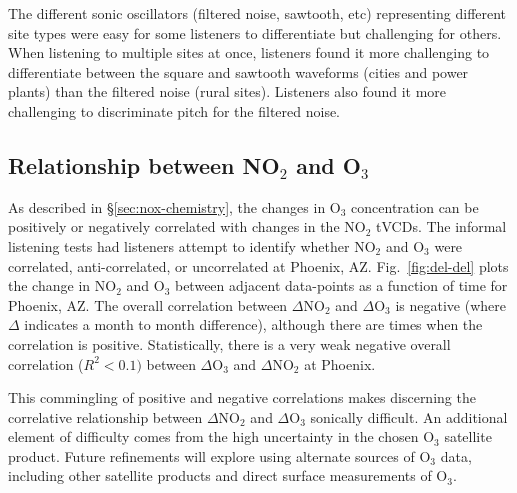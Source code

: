 \documentclass[a4paper,10pt,oneside]{article}
\newcommand{\ce}[1]{$\mathrm{#1}$}
\begin{document}
\begin{sloppy}
The different sonic oscillators (filtered noise, sawtooth, etc) representing different site types were easy for some listeners to differentiate but challenging for others.  When listening to multiple sites at once, listeners found it more challenging to differentiate between the square and sawtooth waveforms (cities and power plants) than the filtered noise (rural sites). Listeners also found it more challenging to discriminate pitch for the filtered noise.   

\subsection{Relationship between NO$_2$ and O$_3$}

	As described in \S\ref{sec:nox-chemistry}, the changes in \ce{O_3} concentration can be positively or negatively correlated with changes in the \ce{NO_2} tVCDs. The informal listening tests had listeners attempt to identify whether \ce{NO_2} and \ce{O_3} were correlated, anti-correlated, or uncorrelated at Phoenix, AZ. Fig.~\ref{fig:del-del} plots the change in \ce{NO_2} and \ce{O_3} between adjacent data-points as a function of time for Phoenix, AZ. The overall correlation between $\Delta$\ce{NO_2} and $\Delta$\ce{O_3} is negative (where $\Delta$ indicates a month to month difference), although there are times when the correlation is positive. Statistically, there is a very weak negative overall correlation ($R^2 < 0.1)$ between $\Delta$\ce{O_3} and $\Delta$\ce{NO_2} at Phoenix. 
	
	This commingling of positive and negative correlations makes discerning the correlative relationship between $\Delta$\ce{NO_2} and $\Delta$\ce{O_3} sonically difficult. An additional element of difficulty comes from the high uncertainty in the chosen \ce{O_3} satellite product. Future refinements will explore using alternate sources of \ce{O_3} data, including other satellite products and direct surface measurements of \ce{O_3}.
	

\end{sloppy}
\end{document}
